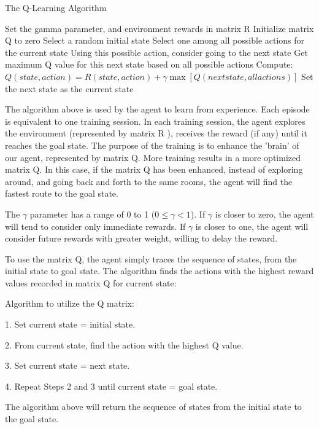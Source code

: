 \documentclass[a4paper, 11pt]{article}
\begin{document}
  \begin{algorithm} 
%    
     \caption{The Q-Learning Algorithm} 
       Set the gamma parameter, and environment rewards in matrix R\;
        Initialize matrix Q to zero\;        
        { 
            Select a random initial state\;
            { 
                Select one among all possible actions for the current state\;
				Using this possible action, consider going to the next state\;
				Get maximum Q value for this next state based on all possible actions\;
				Compute: $Q(state, action) = R(state, action) + \gamma\max[Q(next state, all actions)]$\;
				Set the next state as the current state\;
            }             
        } 
        
    \end{algorithm}

The algorithm above is used by the agent to learn from experience.  Each episode is equivalent to one training session.  In each training session, the agent explores the environment (represented by matrix R ), receives the reward (if any) until it reaches the goal state. The purpose of the training is to enhance the 'brain' of our agent, represented by matrix Q.  More training results in a more optimized matrix Q.  In this case, if the matrix Q has been enhanced, instead of exploring around, and going back and forth to the same rooms, the agent will find the fastest route to the goal state.

The $\gamma$ parameter has a range of 0 to 1 ($0\leq\gamma<1$).  If $\gamma$ is closer to zero, the agent will tend to consider only immediate rewards.  If $\gamma$ is closer to one, the agent will consider future rewards with greater weight, willing to delay the reward.

To use the matrix Q, the agent simply traces the sequence of states, from the initial state to goal state.  The algorithm finds the actions with the highest reward values recorded in matrix Q for current state:

Algorithm to utilize the Q matrix:

1. Set current state = initial state.

2. From current state, find the action with the highest Q value.

3. Set current state = next state.

4. Repeat Steps 2 and 3 until current state = goal state.

The algorithm above will return the sequence of states from the initial state to the goal state.
\end{document}
